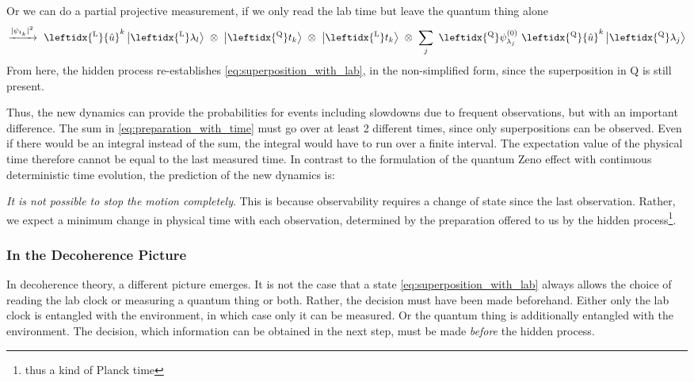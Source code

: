 \documentclass[12pt]{article}
\begin{document}
Or we can do a partial projective measurement, if we only read the lab time but leave the quantum thing alone
\begin{equation}
\xrightarrow{|\psi_{t_k}|^2}\ 
\leftidx{^\mathrm{L}}{\hat{u}}^k \ket{ \leftidx{^\mathrm{L}}\lambda_l} 
\ \otimes\ \ket{\leftidx{^\mathrm{Q}}t_k}
\ \otimes\ \ket{\leftidx{^\mathrm{L}}t_k}
\ \otimes\ \sum_{j}\ \leftidx{^\mathrm{Q}}\psi_{\lambda_j}^{(0)}\ 
\leftidx{^\mathrm{Q}}{\hat{u}}^k
\ket{\leftidx{^\mathrm{Q}}\lambda_j} 
\end{equation}
From here, the hidden process re-establishes \eqref{eq:superposition_with_lab}, in the non-simplified form, since the superposition in Q is still present.

Thus, the new dynamics can provide the probabilities for events including slowdowns due to frequent observations, but with an important difference. The sum in \eqref{eq:preparation_with_time} must go over at least 2 different times, since only  superpositions can be observed. Even if there would be an integral instead of the sum, the integral would have to run over a finite interval. The expectation value of the physical time therefore cannot be equal to the last measured time. In contrast to the formulation of the quantum Zeno effect with continuous deterministic time evolution, the prediction of the new dynamics is: 

\emph{It is not possible to stop the motion completely}. This is because observability requires a change of state since the last observation. Rather, we expect a minimum change in physical time with each observation, determined by the preparation offered to us by the hidden process\footnote{thus a kind of Planck time}.

\subsubsection{In the Decoherence Picture} 

In decoherence theory, a different picture emerges. It is not the case that a state \eqref{eq:superposition_with_lab} always allows the choice of reading the lab clock or measuring a quantum thing or both. Rather, the decision must have been made beforehand. Either only the lab clock is entangled with the environment, in which case only it can be measured. Or the quantum thing is additionally entangled with the environment. The decision, which information can be obtained in the next step, must be made \emph{before} the hidden process.
\end{document}
